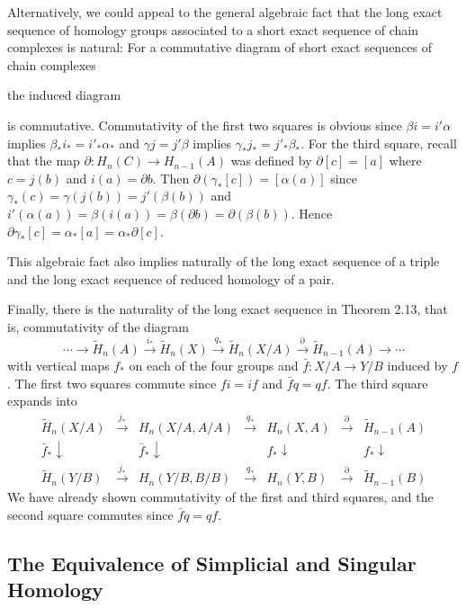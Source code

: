 Alternatively, we could appeal to the general algebraic fact that the long exact sequence of homology groups associated to a short exact sequence of chain complexes is natural: For a commutative diagram of short exact sequences of chain complexes

the induced diagram

is commutative. Commutativity of the first two squares is obvious since $\beta i = i'\alpha$ implies $\beta_* i_* = i'_*\alpha_*$ and $\gamma j = j'\beta$ implies $\gamma_* j_* = j'_*\beta_*$. For the third square, recall that the map $\partial:H_n(C)\to H_{n-1}(A)$ was defined by $\partial[c] = [a]$ where $c = j(b)$ and $i(a) = \partial b$. Then $\partial(\gamma_*[c]) = [\alpha(a)]$ since $\gamma_*(c) = \gamma(j(b)) = j'(\beta(b))$ and $i'(\alpha(a)) = \beta(i(a)) = \beta(\partial b) = \partial(\beta(b))$. Hence $\partial\gamma_*[c] = \alpha_*[a] = \alpha_*\partial[c]$.

This algebraic fact also implies naturally of the long exact sequence of a triple
and the long exact sequence of reduced homology of a pair.

Finally, there is the naturality of the long exact sequence in Theorem 2.13, that
is, commutativity of the diagram
\[
\cdots \to \tilde H_n(A) \xrightarrow{i_*} \tilde H_n(X) \xrightarrow{q_*} \tilde H_n(X/A) \xrightarrow{\partial} \tilde H_{n-1}(A) \to \cdots
\]
with vertical maps $f_*$ on each of the four groups and $\bar f: X/A \to Y/B$ induced
by $f$. The first two squares commute since $fi = if$ and $\bar f q = qf$. The third square
expands into
\[
\begin{array}{ccccccc}
\tilde H_n(X/A) & \xrightarrow{j_*} & H_n(X/A, A/A) & \xrightarrow{q_*} & H_n(X,A) & \xrightarrow{\partial} & \tilde H_{n-1}(A) \\
\bar f_* \downarrow & & \bar f_* \downarrow & & f_* \downarrow & & f_* \downarrow \\
\tilde H_n(Y/B) & \xrightarrow{j_*} & H_n(Y/B, B/B) & \xrightarrow{q_*} & H_n(Y,B) & \xrightarrow{\partial} & \tilde H_{n-1}(B)
\end{array}
\]
We have already shown commutativity of the first and third squares, and the second
square commutes since $\bar f q = qf$.

\subsection*{The Equivalence of Simplicial and Singular Homology}

